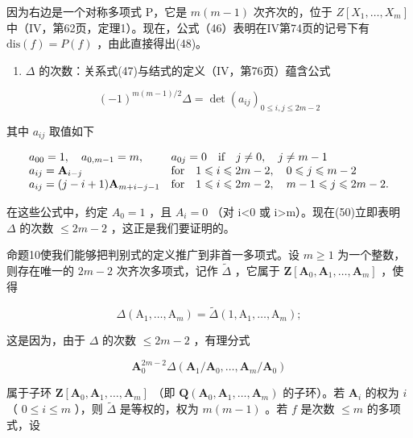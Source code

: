 因为右边是一个对称多项式 P，它是 \(m(m-1)\) 次齐次的，位于 \(Z[X_{1},\ldots,X_{m}]\) 中（IV，第62页，定理1）。现在，公式（46）表明在IV第74页的记号下有 \(\text{dis}(f)=P(f)\) ，由此直接得出(48)。

\begin{enumerate}
\def\labelenumi{\alph{enumi})}
\setcounter{enumi}{2}
\tightlist
\item
  \(\Delta\) 的次数：关系式(47)与结式的定义（IV，第76页）蕴含公式
\end{enumerate}

\[
(- 1) ^ {m (m - 1) / 2} \Delta = \det \left(a _ {i j}\right) _ {0 \leqslant i, j \leqslant 2 m - 2}\tag{50}
\]

其中 \(a_{ij}\) 取值如下

\[
\begin{array}{l l} a _ {0 0} = 1, \quad a _ {0, m - 1} = m, & a _ {0 j} = 0 \quad \text {if} \quad j \neq 0, \quad j \neq m - 1 \\ a _ {i j} = \mathbf {A} _ {i - j} & \text {for} \quad 1 \leqslant i \leqslant 2 m - 2, \quad 0 \leqslant j \leqslant m - 2 \\ a _ {i j} = (j - i + 1) \mathbf {A} _ {m + i - j - 1} & \text {for} \quad 1 \leqslant i \leqslant 2 m - 2, \quad m - 1 \leqslant j \leqslant 2 m - 2. \end{array}
\]

在这些公式中，约定 \(A_{0}=1\) ，且 \(A_{i}=0\) （对 i\textless0 或 i\textgreater m）。现在(50)立即表明 \(\Delta\) 的次数 \(\leqslant2m-2\) ，这正是我们要证明的。

命题10使我们能够把判别式的定义推广到非首一多项式。设 \(m \geqslant 1\) 为一个整数，则存在唯一的 \(2m - 2\) 次齐次多项式，记作 \(\tilde{\Delta}\) ，它属于 \(\mathbf{Z}[\mathbf{A}_0, \mathbf{A}_1, \ldots, \mathbf{A}_m]\) ，使得

\[
\Delta \left(\mathrm{A} _ {1}, \dots , \mathrm{A} _ {m}\right) = \tilde {\Delta} \left(1, \mathrm{A} _ {1}, \dots , \mathrm{A} _ {m}\right);\tag{51}
\]

这是因为，由于 \(\Delta\) 的次数 \(\leqslant 2m - 2\) ，有理分式

\[
\mathbf {A} _ {0} ^ {2 m - 2} \Delta (\mathbf {A} _ {1} / \mathbf {A} _ {0}, \dots , \mathbf {A} _ {m} / \mathbf {A} _ {0})
\]

属于子环 \(\mathbf{Z}[\mathbf{A}_0, \mathbf{A}_1, \ldots, \mathbf{A}_m]\) （即 \(\mathbf{Q}(\mathbf{A}_0, \mathbf{A}_1, \ldots, \mathbf{A}_m)\) 的子环）。若 \(\mathbf{A}_i\) 的权为 \(i\) （ \(0 \leqslant i \leqslant m\) ），则 \(\tilde{\Delta}\) 是等权的，权为 \(m(m - 1)\) 。若 \(f\) 是次数 \(\leqslant m\) 的多项式，设


